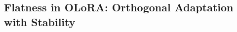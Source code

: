 \documentclass[letterpaper]{article} %
\begin{document}






\subsection{Flatness in OLoRA: Orthogonal Adaptation with Stability}
\end{document}
